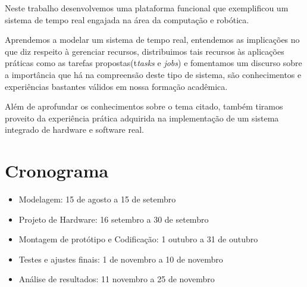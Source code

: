 \documentclass{abnt}
\begin{document}
Neste trabalho desenvolvemos uma plataforma funcional que
exemplificou um sistema de tempo real engajada na área da computação e
robótica. 

Aprendemos a modelar um sistema de tempo real, entendemos as implicações no que diz
respeito à gerenciar recursos, distribuimos tais recursos às aplicações práticas
como as tarefas propostas(t\textit{tasks} e \textit{jobs}) e fomentamos um discurso sobre a
importância que há na compreensão deste tipo de sistema, são conhecimentos e
experiências bastantes válidos em nossa formação acadêmica.

Além de aprofundar os conhecimentos sobre o tema citado, também tiramos
proveito da experiência prática adquirida na implementação de um sistema
integrado de hardware e software real.

\chapter{Cronograma} \label{cronol}  

\begin{itemize}
     
     \item Modelagem: 15 de agosto a 15 de setembro 
     \item Projeto de Hardware: 16 setembro a 30 de setembro 
     \item Montagem de protótipo e Codificação: 1 outubro a 31 de outubro
     \item Testes e ajustes finais: 1 de novembro a 10 de novembro
     \item Análise de resultados: 11 novembro a 25 de novembro

\end{itemize}
\end{document}

